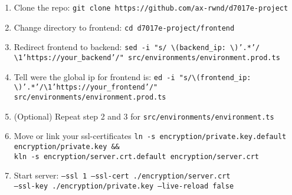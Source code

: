 \begin{enumerate}
    \item Clone the repo: \texttt{git clone https://github.com/ax-rwnd/d7017e-project}
    \item Change directory to frontend: \texttt{cd d7017e-project/frontend}
    \item Redirect frontend to backend: \texttt{sed -i "s/ \textbackslash (backend\_ip: \textbackslash )'.*'/ \\ \textbackslash 1'https://{your\_backend}'/" src/environments/environment.prod.ts}
    \item Tell were the global ip for frontend is: \texttt{ed -i "s/\textbackslash (frontend\_ip: \\ \textbackslash)'.*'/\textbackslash 1'https://{your\_frontend}'/" src/environments/environment.prod.ts}
    \item (Optional) Repeat step 2 and 3 for \texttt{src/environments/environment.ts}
    \item Move or link your ssl-certificates \texttt{ln -s encryption/private.key.default \\
    encryption/private.key \&\& \\
   kln -s encryption/server.crt.default encryption/server.crt}
    \item Start server: \texttt{--ssl 1 --ssl-cert ./encryption/server.crt \\
    --ssl-key ./encryption/private.key --live-reload false}
\end{enumerate}
